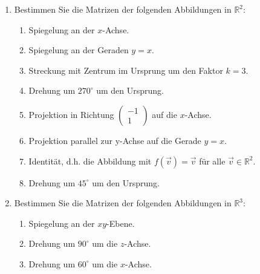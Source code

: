 \begin{ueb}
\begin{enumerate}
        \[
        f(\vec{v}) = 
        \begin{pmatrix} 1 & 0 & -1 \\ 2 & 1 & 0 \\ 3 & -3 & 1 \end{pmatrix}
        \cdot \vec{v}
        \]
    
        \item Bestimmen Sie die Matrizen der folgenden Abbildungen in \( \mathbb{R}^2 \):
        \begin{enumerate}
            \item Spiegelung an der $x$-Achse.
            \item Spiegelung an der Geraden \( y = x \).
            \item Streckung mit Zentrum im Ursprung um den Faktor \( k=3 \).
            \item Drehung um \( 270^\circ \) um den Ursprung.
            \item Projektion in Richtung \( \begin{pmatrix} -1 \\ 1 \end{pmatrix} \) auf die $x$-Achse.
            \item Projektion parallel zur y-Achse auf die Gerade \( y = x \).
            \item Identität, d.h. die Abbildung mit \( f(\vec{v}) = \vec{v} \) für alle \( \vec{v} \in \mathbb{R}^2 \).
            \item Drehung um \( 45^\circ \) um den Ursprung.
        \end{enumerate}
    
        \item Bestimmen Sie die Matrizen der folgenden Abbildungen in \( \mathbb{R}^3 \):
        \begin{enumerate}
            \item Spiegelung an der $xy$-Ebene.
            \item Drehung um \( 90^\circ \) um die $z$-Achse.
            \item Drehung um \( 60^\circ \) um die $x$-Achse.
        \end{enumerate}
    \end{enumerate}
    

\end{ueb}

